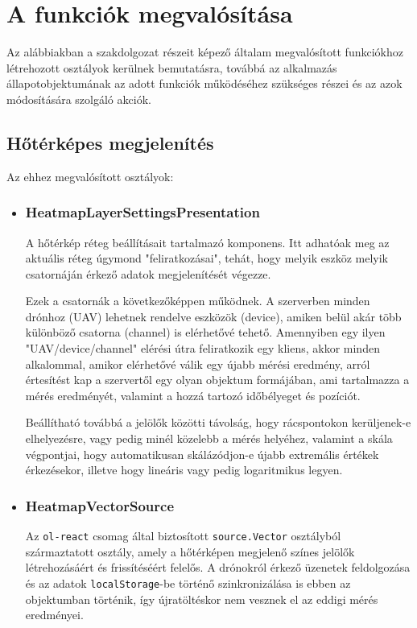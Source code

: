 \section{A funkciók megvalósítása}

Az alábbiakban a szakdolgozat részeit képező általam megvalósított funkciókhoz
létrehozott osztályok kerülnek bemutatásra, továbbá az alkalmazás
állapotobjektumának az adott funkciók működéséhez szükséges részei és az azok
módosítására szolgáló akciók.

\subsection{Hőtérképes megjelenítés}

\noindent Az ehhez megvalósított osztályok:
\begin{itemize}

\item\subsubsection{HeatmapLayerSettingsPresentation}
A hőtérkép réteg beállításait tartalmazó komponens.
Itt adhatóak meg az aktuális réteg úgymond "feliratkozásai", tehát, hogy melyik
eszköz melyik csatornáján érkező adatok megjelenítését végezze.

Ezek a csatornák a következőképpen működnek. A szerverben minden drónhoz (UAV)
lehetnek rendelve eszközök (device), amiken belül akár több különböző csatorna
(channel) is elérhetővé tehető. Amennyiben egy ilyen "UAV/device/channel"
elérési útra feliratkozik egy kliens, akkor minden alkalommal, amikor elérhetővé
válik egy újabb mérési eredmény, arról értesítést kap a szervertől egy olyan
objektum formájában, ami tartalmazza a mérés eredményét, valamint a hozzá
tartozó időbélyeget és pozíciót.

Beállítható továbbá a jelölők közötti távolság, hogy rácspontokon kerüljenek-e
elhelyezésre, vagy pedig minél közelebb a mérés helyéhez, valamint a skála
végpontjai, hogy automatikusan skálázódjon-e újabb extremális értékek
érkezésekor, illetve hogy lineáris vagy pedig logaritmikus legyen.

\item\subsubsection{HeatmapVectorSource}
Az \verb|ol-react| csomag által biztosított \verb|source.Vector| osztályból
származtatott osztály, amely a hőtérképen megjelenő színes jelölők
létrehozásáért és frissítéséért felelős.
A drónokról érkező üzenetek feldolgozása és az adatok \verb|localStorage|-be
történő szinkronizálása is ebben az objektumban történik, így újratöltéskor nem
vesznek el az eddigi mérés eredményei.


\end{itemize}
